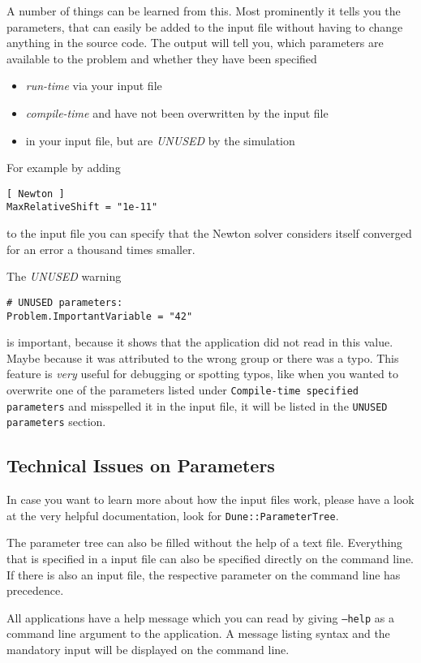 A number of things can be learned from this. Most prominently it tells you the parameters,
that can easily be added to the input file without having to change anything in the source code.
The output will tell you, which parameters are available to the problem and whether they have
been specified
\begin{itemize}
  \item \emph{run-time} via your input file
  \item \emph{compile-time} and have not been overwritten by the input file
  \item in your input file, but are \emph{UNUSED} by the simulation
\end{itemize}
For example by adding
\begin{lstlisting}[style=Bash]
[ Newton ]
MaxRelativeShift = "1e-11"
\end{lstlisting}
to the input file you can specify that the Newton solver considers itself converged for an
error a thousand times smaller.

The \emph{UNUSED} warning
\begin{lstlisting}[style=Bash]
# UNUSED parameters:
Problem.ImportantVariable = "42"
\end{lstlisting}
is important, because it shows that the application did not read in this value.
Maybe because it was attributed to the wrong group or there was a typo.
This feature is \emph{very} useful for debugging or spotting typos, like when you wanted
to overwrite one of the parameters listed under \texttt{Compile-time specified parameters}
and misspelled it in the input file, it will be listed in the \texttt{UNUSED parameters} section.

\subsection{Technical Issues on Parameters}
In case you want to learn more about how the input files work, please have a
look at the very helpful \Dune documentation, look for
\texttt{Dune::ParameterTree}.

The parameter tree can also be filled without the help of a text file.
Everything that is specified in a \Dumux input file can also be specified
directly on the command line. If there is also an input file, the respective
parameter on the command line has precedence.

All applications have a help message which you can read by giving
\texttt{--help}   as a command line argument to the application. A message
listing syntax and the mandatory input will be displayed on the command line.


